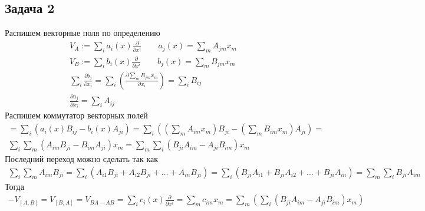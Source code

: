 \subsection*{Задача 2}
	Распишем векторные поля по определению
	\begin{gather*}
		V_A := \sum\limits_i a_i(x) \frac{\partial }{\partial x^{i}}\qquad a_j(x) = \sum\limits_{m} A_{jm}x_m\\
		V_B := \sum\limits_i b_i(x) \frac{\partial }{\partial x^{i}}\qquad b_j(x) = \sum\limits_{m} B_{jm}x_m\\
		\sum\limits_{i} \frac{\partial b_j}{\partial x_i} = 
		\sum\limits_{i} \left( \frac{\partial  \sum\limits_{m} B_{jm} x_m}{\partial x_i}\right) =
		\sum\limits_{i} B_{ij}\\
		\frac{\partial a_j}{\partial x_i} = \sum\limits_{i} A_{ij}
	\end{gather*}
	Распишем коммутатор векторных полей
	\begin{gather*}
		[V_A,V_B] = 
		\sum\limits_{i}(a_i(x)B_{ij} - b_i(x) A_{ji}) = 
		\sum\limits_{i}\left(\left(\sum\limits_{m} A_{im}x_m\right)B_{ji} - \left(\sum\limits_{m} B_{im}x_m\right)A_{ji}\right) =\\
		\sum\limits_{i} \sum\limits_{m} \left(A_{im} B_{ji} - B_{im} A_{ji}\right) x_m =
		\sum\limits_{m} \sum\limits_{i} \left(B_{ji} A_{im} - A_{ji} B_{im}\right) x_m
	\end{gather*}
	Последний переход можно сделать так как
	\begin{gather*}
		\sum\limits_{i} \sum\limits_{m} A_{im} B_{ji} = 
		\sum\limits_{i} (A_{i1} B_{ji} + A_{i2} B_{ji} + \ldots + A_{in} B_{ji}) =
		\sum\limits_{i} (B_{ji} A_{i1} + B_{ji} A_{i2} + \ldots + B_{ji} A_{in}) =
		\sum\limits_{m} \sum\limits_{i} B_{ji} A_{im}
	\end{gather*} 
	Тогда
	\begin{gather*}
		-V_{[A,B]} = V_{[B,A]} = V_{BA - AB} =
		\sum\limits_{i} c_i(x) \frac{\partial }{\partial x^{i}} =
		\sum\limits_{m} c_{im} x_{m} =
		\sum\limits_{m} \left(\sum\limits_{i} (B_{ji} A_{im} - A_{ji} B_{im}) x_m \right)
	\end{gather*}
\vskip0.5in

